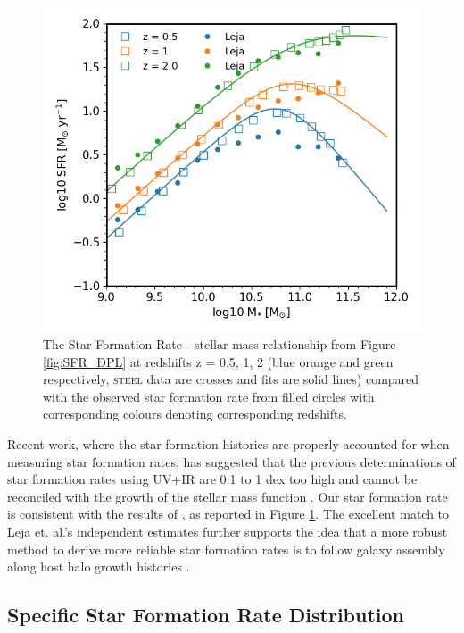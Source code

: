 \begin{figure}[h]
	\centering
	\includegraphics[width = 0.8\linewidth]{Figures/Chapter4/HMC_DPL_wLeja.png}
    \caption{The Star Formation Rate - stellar mass relationship from Figure \ref{fig:SFR_DPL} at redshifts z = 0.5, 1, 2 (blue orange and green respectively, \textsc{steel} data are crosses and fits are solid lines) compared with the observed star formation rate from \citet{Leja2019AnSurvey} filled circles with corresponding colours denoting corresponding redshifts.}
	\label{fig:SFR_L18}
\end{figure}

Recent work, where the star formation histories are properly accounted for when measuring star formation rates, has suggested that the previous determinations of star formation rates using UV+IR are 0.1 to 1 dex too high \citep{Leja2019AnSurvey} and cannot be reconciled with the growth of the stellar mass function \citep{Leja2015ReconcilingFunction, Lapi2017StellarEquation}. Our star formation rate is consistent with the results of \citet{Leja2019AnSurvey}, as reported in Figure \ref{fig:SFR_L18}. The excellent match to Leja et. al.'s independent estimates further supports the idea that a more robust method to derive more reliable star formation rates is to follow galaxy assembly along host halo growth histories \citep[see e.g.,][]{Moster2018Emerge10}. 

\subsection{Specific Star Formation Rate Distribution}
\label{subsec:sSFR}

